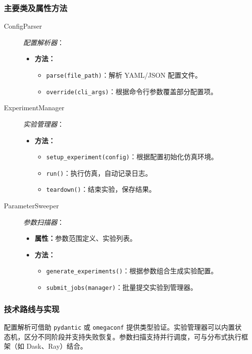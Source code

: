 \subsubsection{主要类及属性方法}
\begin{description}
  \item[ConfigParser] \emph{配置解析器}：
  \begin{itemize}
    \item \textbf{方法：}
      \begin{itemize}
        \item \verb|parse(file_path)|：解析 YAML/JSON 配置文件。
        \item \verb|override(cli_args)|：根据命令行参数覆盖部分配置项。
      \end{itemize}
  \end{itemize}
  \item[ExperimentManager] \emph{实验管理器}：
  \begin{itemize}
    \item \textbf{方法：}
      \begin{itemize}
        \item \verb|setup_experiment(config)|：根据配置初始化仿真环境。
        \item \verb|run()|：执行仿真，自动记录日志。
        \item \verb|teardown()|：结束实验，保存结果。
      \end{itemize}
  \end{itemize}
  \item[ParameterSweeper] \emph{参数扫描器}：
  \begin{itemize}
    \item \textbf{属性：}参数范围定义、实验列表。
    \item \textbf{方法：}
      \begin{itemize}
        \item \verb|generate_experiments()|：根据参数组合生成实验配置。
        \item \verb|submit_jobs(manager)|：批量提交实验到管理器。
      \end{itemize}
  \end{itemize}
\end{description}

\subsubsection{技术路线与实现}
配置解析可借助 \verb|pydantic| 或 \verb|omegaconf| 提供类型验证。实验管理器可以内置状态机，区分不同阶段并支持失败恢复。参数扫描支持并行调度，可与分布式执行框架（如 Dask、Ray）结合。


